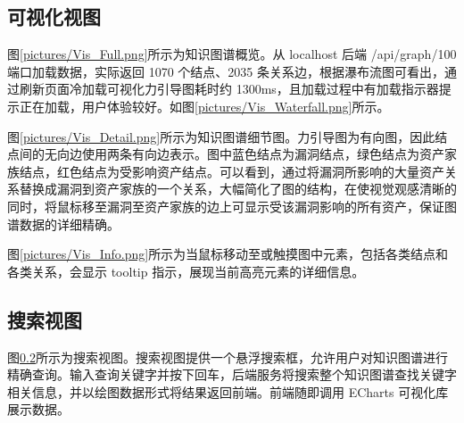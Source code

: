 \documentclass[a4paper,AutoFakeBold,oneside,12pt]{book}
\begin{document}


\subsection{可视化视图}

图\ref{pictures/Vis_Full.png}所示为知识图谱概览。从 localhost 后端 /api/graph/100 端口加载数据，实际返回 1070 个结点、2035 条关系边，根据瀑布流图可看出，通过刷新页面冷加载可视化力引导图耗时约 1300ms，且加载过程中有加载指示器提示正在加载，用户体验较好。如图\ref{pictures/Vis_Waterfall.png}所示。



图\ref{pictures/Vis_Detail.png}所示为知识图谱细节图。力引导图为有向图，因此结点间的无向边使用两条有向边表示。图中蓝色结点为漏洞结点，绿色结点为资产家族结点，红色结点为受影响资产结点。可以看到，通过将漏洞所影响的大量资产关系替换成漏洞到资产家族的一个关系，大幅简化了图的结构，在使视觉观感清晰的同时，将鼠标移至漏洞至资产家族的边上可显示受该漏洞影响的所有资产，保证图谱数据的详细精确。


图\ref{pictures/Vis_Info.png}所示为当鼠标移动至或触摸图中元素，包括各类结点和各类关系，会显示 tooltip 指示，展现当前高亮元素的详细信息。


\subsection{搜索视图}

图\ref{}所示为搜索视图。搜索视图提供一个悬浮搜索框，允许用户对知识图谱进行精确查询。输入查询关键字并按下回车，后端服务将搜索整个知识图谱查找关键字相关信息，并以绘图数据形式将结果返回前端。前端随即调用 ECharts 可视化库展示数据。

\end{document}
